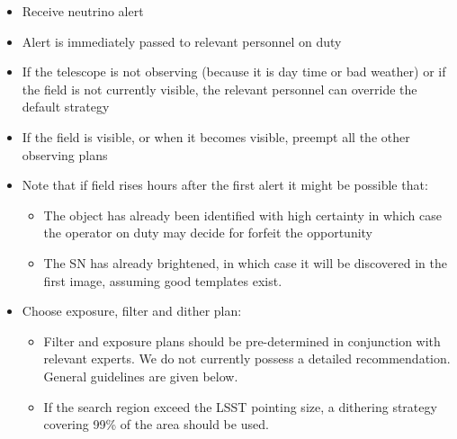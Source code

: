 \documentclass[11pt, letterpaper]{article}
\begin{document}
\begin{itemize}
\item Receive neutrino alert
\item Alert is immediately passed to relevant personnel on duty
\item If the telescope is not observing (because it is day time or bad
  weather) or if the field is not currently visible, the relevant
  personnel can override the default strategy
\item If the field is visible, or when it becomes visible, preempt all
  the other observing plans
\item Note that if field rises hours after the first alert it might be possible that:
  \begin{itemize}
  \item The object has already been identified with high certainty in
    which case the operator on duty may decide for forfeit the
    opportunity
  \item The SN has already brightened, in which case it will be
    discovered in the first image, assuming good templates exist.
\end{itemize}

\item Choose exposure, filter and dither plan:
\begin{itemize}
\item Filter and exposure plans should be pre-determined in
  conjunction with relevant experts. We do not currently possess a
  detailed recommendation. General guidelines are given below.
\item If the search region exceed the LSST pointing size, a dithering
  strategy covering 99\% of the area should be used.
\end{itemize}


\end{itemize}
\end{document}
